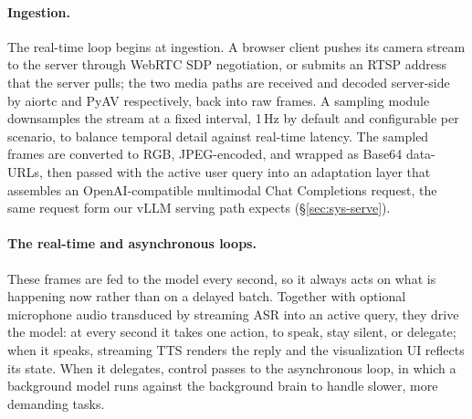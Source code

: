 \documentclass{llmxive}
\begin{document}
\paragraph{\textbf{Ingestion.}} The real-time loop begins at ingestion. A browser client pushes its camera stream to the server through WebRTC SDP negotiation, or submits an RTSP address that the server pulls; the two media paths are received and decoded server-side by aiortc and PyAV respectively, back into raw frames. A sampling module downsamples the stream at a fixed interval, 1\,Hz by default and configurable per scenario, to balance temporal detail against real-time latency. The sampled frames are converted to RGB, JPEG-encoded, and wrapped as Base64 data-URLs, then passed with the active user query into an adaptation layer that assembles an OpenAI-compatible multimodal Chat Completions request, the same request form our vLLM serving path expects (§\ref{sec:sys-serve}).


\paragraph{\textbf{The real-time and asynchronous loops.}} These frames are fed to the model every second, so it always acts on what is happening now rather than on a delayed batch. Together with optional microphone audio transduced by streaming ASR into an active query, they drive the model: at every second it takes one action, to speak, stay silent, or delegate; when it speaks, streaming TTS renders the reply and the visualization UI reflects its state. When it delegates, control passes to the asynchronous loop, in which a background model runs against the background brain to handle slower, more demanding tasks.
\end{document}
